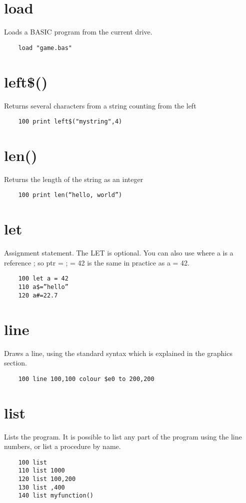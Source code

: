 \section*{load}
Loads a BASIC program from the current drive.
\example{}
\begin{verbatim}
	load "game.bas"
\end{verbatim}

\section*{left\$()}
Returns several characters from a string counting from the left
\example{}
\begin{verbatim}
	100 print left$("mystring",4)
\end{verbatim}

\section*{len()}
Returns the length of the string as an integer
\example{}
\begin{verbatim}
	100 print len(“hello, world”)
\end{verbatim}

\section*{let}
Assignment statement. The LET is optional. You can also use \@a where a is a reference ; so ptr = \@a ; \@ptr = 42 is the same in practice as a = 42.
\example{}
\begin{verbatim}
	100 let a = 42
	110 a$=”hello”
	120 a#=22.7
\end{verbatim}

\section*{line}
Draws a line, using the standard syntax which is explained in the graphics section.
\example{}
\begin{verbatim}
	100 line 100,100 colour $e0 to 200,200
\end{verbatim}

\section*{list}
Lists the program.  It is possible to list any part of the program using the line numbers, or list a procedure by name.
\example{}
\begin{verbatim}
	100 list
	110 list 1000
	120 list 100,200
	130 list ,400
	140 list myfunction()
\end{verbatim}

